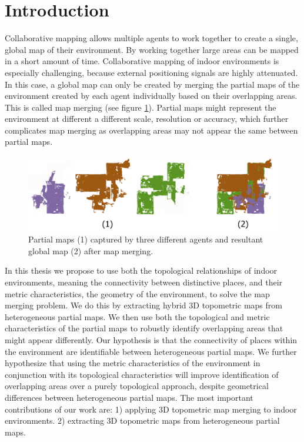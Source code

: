 
\section{Introduction}
Collaborative mapping allows multiple agents to work together to create a single, global map of their environment. By working together large areas can be mapped in a short amount of time. Collaborative mapping of indoor environments is especially challenging, because external positioning signals are highly attenuated. In this case, a global map can only be created by merging the partial maps of the environment created by each agent individually based on their overlapping areas. This is called map merging (see figure \ref{fig:map_merging}). Partial maps might represent the environment at different a different scale, resolution or accuracy, which further complicates map merging as overlapping areas may not appear the same between partial maps.

\begin{figure}[h]
    \centering
    \includegraphics*[width=\textwidth]{./fig/map_merging.png}
    \caption{Partial maps (1) captured by three different agents and resultant global map (2) after map merging.}
    \label{fig:map_merging}
\end{figure}

In this thesis we propose to use both the topological relationships of indoor environments, meaning the connectivity between distinctive places, and their metric characteristics, the geometry of the environment, to solve the map merging problem.  We do this by extracting hybrid 3D topometric maps from heterogeneous partial maps. We then use both the topological and metric characteristics of the partial maps to robustly identify overlapping areas that might appear differently.  Our hypothesis is that the connectivity of places within the environment are identifiable between heterogeneous partial maps. We further hypothesize that using the metric characteristics of the environment in conjunction with its topological characteristics will improve identification of overlapping areas over a purely topological approach, despite geometrical differences between heterogeneous partial maps. The most important contributions of our work are: 1) applying 3D topometric map merging to indoor environments. 2) extracting 3D topometric maps from heterogeneous partial maps.